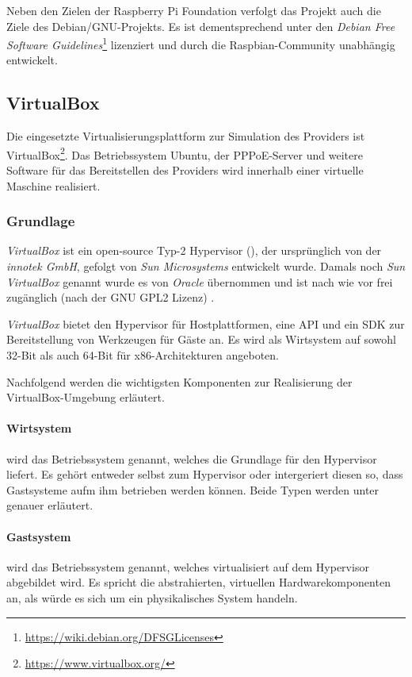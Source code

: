 Neben den Zielen der Raspberry Pi Foundation verfolgt das Projekt
auch die Ziele des Debian/GNU-Projekts. Es ist dementsprechend unter
den \textit{Debian Free Software Guidelines}\footnote{\url{https://wiki.debian.org/DFSGLicenses}}
lizenziert und durch die Raspbian-Community unabhängig entwickelt.
  
\subsection{VirtualBox}
Die eingesetzte Virtualisierungsplattform zur Simulation des Providers ist VirtualBox\footnote{\url{https://www.virtualbox.org/}}. Das Betriebssystem Ubuntu, der PPPoE-Server und weitere Software für
das Bereitstellen des Providers wird innerhalb einer virtuelle Maschine realisiert.

\subsubsection{Grundlage}
\textit{VirtualBox} ist ein open-source Typ-2 Hypervisor (), der
ursprünglich von der \textit{innotek GmbH}, gefolgt von \textit{Sun Microsystems} entwickelt wurde.
Damals noch \textit{Sun VirtualBox} genannt wurde es von \textit{Oracle} übernommen und ist
nach wie vor frei zugänglich (nach der GNU GPL2 Lizenz) \cite{dash13}.

\textit{VirtualBox} bietet den Hypervisor für Hostplattformen, eine API und ein SDK zur
Bereitstellung von Werkzeugen für Gäste an. Es wird als Wirtsystem auf sowohl 32-Bit als auch
64-Bit für x86-Architekturen angeboten.

Nachfolgend werden die wichtigsten Komponenten zur Realisierung der VirtualBox-Umgebung
erläutert.

\paragraph{Wirtsystem} wird das Betriebssystem genannt, welches die Grundlage für den Hypervisor
liefert. Es gehört entweder selbst zum Hypervisor oder intergeriert diesen so, dass Gastsysteme
aufm ihm betrieben werden können. Beide Typen werden unter  genauer
erläutert.

\paragraph{Gastsystem} wird das Betriebssystem genannt, welches virtualisiert auf dem Hypervisor
abgebildet wird. Es spricht die abstrahierten, virtuellen Hardwarekomponenten an, als würde
es sich um ein physikalisches System handeln.

